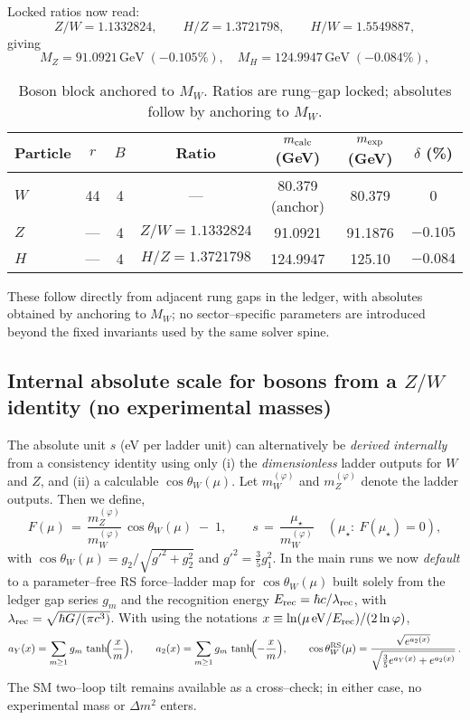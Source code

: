 \documentclass[%
  amsmath,amssymb,
  aps,
 prb,
 floatfix, showkeys
 ]{revtex4-2}
\begin{document}
  Locked ratios now read:
 \[
 Z/W=1.1332824,\qquad H/Z=1.3721798,\qquad H/W=1.5549887,
 \]
 giving
 \[
 M_Z=91.0921\,\text{GeV}\;(-0.105\%),\quad
 M_H=124.9947\,\text{GeV}\;(-0.084\%),
 \]
 \begin{table}[H]
 \caption{Boson block anchored to $M_W$. Ratios are rung--gap locked; absolutes follow by anchoring to $M_W$.}
 \label{tab:bosons}
 \begin{tabular}{l c c c c c c}
 \hline
 Particle & $r$ & $B$ & Ratio & $m_{\rm calc}$ (GeV) & $m_{\rm exp}$ (GeV) & $\delta$ (\%) \\
 \hline
 $W$ & 44  & 4 & ---                 & 80.379 (anchor) & 80.379   & 0 \\
 $Z$ & --- & 4 & $Z/W=1.1332824$    & 91.0921         & 91.1876  & $-0.105$ \\
 $H$ & --- & 4 & $H/Z=1.3721798$    & 124.9947        & 125.10   & $-0.084$ \\
 \hline
 \end{tabular}
 \end{table}
 These follow directly from adjacent rung gaps in the ledger, with absolutes obtained by anchoring to $M_W$; no sector--specific parameters are introduced beyond the fixed invariants used by the same solver spine.
 
 \subsection{Internal absolute scale for bosons from a $Z/W$ identity (no experimental masses)}
 \label{subsec:ZW-anchor}
 The absolute unit $s$ (eV per ladder unit) can alternatively be \emph{derived internally} from a consistency identity using only (i) the \emph{dimensionless} ladder outputs for $W$ and $Z$, and (ii) a calculable $\cos\theta_W(\mu)$.
 Let $m_W^{(\varphi)}$ and $m_Z^{(\varphi)}$ denote the ladder outputs. Then we define,
 \begin{equation}
   F(\mu) \,=\, \frac{m_Z^{(\varphi)}}{m_W^{(\varphi)}}\,\cos\theta_W(\mu)\; -\; 1,\qquad
   s \,=\, \frac{\mu_\star}{m_W^{(\varphi)}}\quad(\mu_\star:\ F(\mu_\star)=0),
 \end{equation}
 with $\cos\theta_W(\mu)=g_2/\sqrt{g'^2+g_2^2}$ and $g'^2=\tfrac{3}{5}g_1^2$.
 In the main runs we now \emph{default} to a parameter--free RS force--ladder map for $\cos\theta_W(\mu)$ built solely from the ledger gap series $g_m$ and the recognition energy $E_{\rm rec}=\hbar c/\lambda_{\rm rec}$, with $\lambda_{\rm rec}=\sqrt{\hbar G/(\pi c^3)}$. With using the notations
 $x\equiv \ln(\mu\,\mathrm{eV}/E_{\rm rec})/(2\ln\varphi)$,
 \[
   a_Y(x)=\sum_{m\ge1} g_m\,\tanh\!\Bigl(\frac{x}{m}\Bigr),\qquad
   a_2(x)=\sum_{m\ge1} g_m\,\tanh\!\Bigl(-\frac{x}{m}\Bigr),\qquad
   \cos\theta_W^{\rm RS}(\mu)=\frac{\sqrt{e^{a_2(x)}}}{\sqrt{\tfrac{3}{5}e^{a_Y(x)}+e^{a_2(x)}}}\,.
 \]
 The SM two--loop tilt remains available as a cross--check; in either case, no experimental mass or $\Delta m^2$ enters.
 
\end{document}
